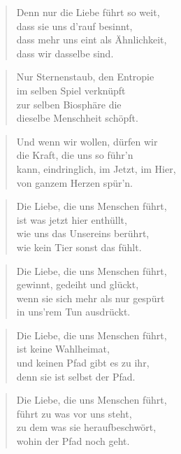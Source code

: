 \documentclass[10pt,a4paper]{article}
\begin{document}
\begin{paracol}{2}
\begin{verse}
Denn nur die Liebe führt so weit, \\
dass sie uns d’rauf besinnt, \\
dass mehr uns eint als Ähnlichkeit, \\
dass wir dasselbe sind. \\
\end{verse}

\begin{verse}
Nur Sternenstaub, den Entropie \\
im selben Spiel verknüpft \\
zur selben Biosphäre die \\
dieselbe Menschheit schöpft. \\
\end{verse}

\begin{verse}
Und wenn wir wollen, dürfen wir \\
die Kraft, die uns so führ’n \\
kann, eindringlich, im Jetzt, im Hier, \\
von ganzem Herzen spür’n. \\
\end{verse}

\begin{verse}
Die Liebe, die uns Menschen führt, \\
ist was jetzt hier enthüllt, \\
wie uns das Unsereins berührt, \\
wie kein Tier sonst das fühlt. \\
\end{verse}

\begin{verse}
Die Liebe, die uns Menschen führt, \\
gewinnt, gedeiht und glückt, \\
wenn sie sich mehr als nur gespürt \\
in uns’rem Tun ausdrückt. \\
\end{verse}

\begin{verse}
Die Liebe, die uns Menschen führt, \\
ist keine Wahlheimat, \\
und keinen Pfad gibt es zu ihr, \\
denn sie ist selbst der Pfad. \\
\end{verse}

\begin{verse}
Die Liebe, die uns Menschen führt, \\
führt zu was vor uns steht, \\
zu dem was sie heraufbeschwört, \\
wohin der Pfad noch geht. \\
\end{verse}

\end{paracol}
\end{document}
